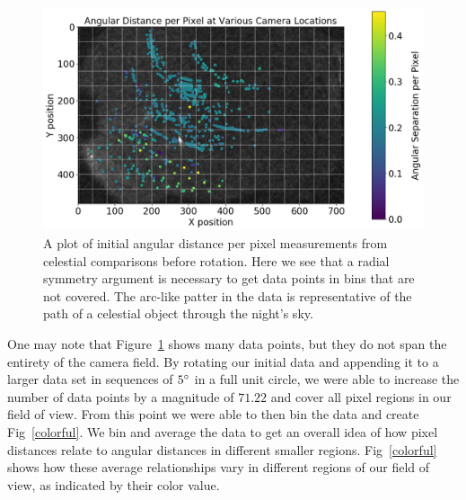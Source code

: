 \begin{figure}[ht!]
  \centering
  \includegraphics[scale=0.47]{images/angular_distance_at_various_locations.png}
  \caption[A plot of initial angular distance per pixel measurements from celestial comparisons before rotation.]{A plot of initial angular distance per pixel measurements from celestial comparisons before rotation.  Here we see that a radial symmetry argument is necessary to get data points in bins that are not covered.  The arc-like patter in the data is representative of the path of a celestial object through the night's sky.}
  \label{angperpix1}
\end{figure}

One may note that Figure~\ref{angperpix1} shows many data points, but they do not span the entirety of the camera field. 
By rotating our initial data and appending it to a larger data set in sequences of $5\degree$ in a full unit circle, we were able to increase the number of data points by a magnitude of $71.22$ and cover all pixel regions in our field of view.
From this point we were able to then bin the data and create Fig~\ref{colorful}.
We bin and average the data to get an overall idea of how pixel distances relate to angular distances in different smaller regions.
Fig~\ref{colorful} shows how these average relationships vary in different regions of our field of view, as indicated by their color value.

